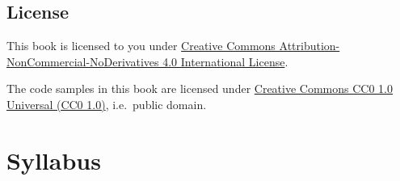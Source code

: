 \documentclass[
]{article}
\begin{document}
\hypertarget{license}{%
\subsection*{License}\label{license}}

This book is licensed to you under \href{http://creativecommons.org/licenses/by-nc-nd/4.0/}{Creative Commons Attribution-NonCommercial-NoDerivatives 4.0 International License}.

The code samples in this book are licensed under \href{https://creativecommons.org/publicdomain/zero/1.0/}{Creative Commons CC0 1.0 Universal (CC0 1.0)}, i.e.~public domain.

\hypertarget{syllabus}{%
\section*{Syllabus}\label{syllabus}}
\end{document}
